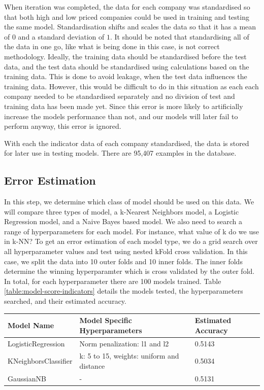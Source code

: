 \documentclass{report}
\begin{document}
When iteration was completed, the data for each company was standardised so that both high and low priced companies could be used in training and testing the same model. Standardisation shifts and scales the data so that it has a mean of $0$ and a standard deviation of $1$. It should be noted that standardising all of the data in one go, like what is being done in this case, is not correct methodology. Ideally, the training data should be standardised before the test data, and the test data should be standardised using calculations based on the training data. This is done to avoid leakage, when the test data influences the training data. However, this would be difficult to do in this situation as each each company needed to be standardised separately and no division of test and training data has been made yet. Since this error is more likely to artificially increase the models performance than not, and our models will later fail to perform anyway, this error is ignored.

With each the indicator data of each company standardised, the data is stored for later use in testing models. There are 95,407 examples in the database.

\subsection{Error Estimation}

In this step, we determine which class of model should be used on this data. We will compare three types of model, a k-Nearest Neighbors model, a Logistic Regression model, and a Naive Bayes based model. We also need to search a range of hyperparameters for each model. For instance, what value of k do we use in k-NN? To get an error estimation of each model type, we do a grid search over all hyperparameter values and test using nested kFold cross validation. In this case, we split the data into 10 outer folds and 10 inner folds. The inner folds determine the winning hyperparamter which is cross validated by the outer fold. In total, for each hyperparameter there are 100 models trained. Table \ref{table:model-score-indicators} details the models tested, the hyperparameters searched, and their estimated accuracy. 

\begin{center}
  
  \begin{tabular}{l | l | l}
	  Model Name & Model Specific Hyperparameters & Estimated Accuracy \\ \hline
	  LogisticRegression & Norm penalization: l1 and l2 & 0.5143 \\ \hline
	  KNeighborsClassifier & k: 5 to 15, weights: uniform and distance & 0.5034 \\ \hline
	  GaussianNB & - & 0.5131
	  \label{table:model-score-indicators}
  \end{tabular}
\end{center}
\end{document}
